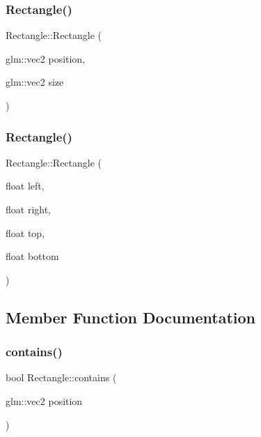 \subsubsection{\texorpdfstring{Rectangle()}{Rectangle()}\hspace{0.1cm}{\footnotesize\ttfamily [1/2]}}
{\footnotesize\ttfamily Rectangle\+::\+Rectangle (\begin{DoxyParamCaption}\item[{glm\+::vec2}]{position,  }\item[{glm\+::vec2}]{size }\end{DoxyParamCaption})}

\mbox{\label{class_rectangle_a09e01909856e5d550a34e6866e91a7c5}} 
\subsubsection{\texorpdfstring{Rectangle()}{Rectangle()}\hspace{0.1cm}{\footnotesize\ttfamily [2/2]}}
{\footnotesize\ttfamily Rectangle\+::\+Rectangle (\begin{DoxyParamCaption}\item[{float}]{left,  }\item[{float}]{right,  }\item[{float}]{top,  }\item[{float}]{bottom }\end{DoxyParamCaption})}



\subsection{Member Function Documentation}
\mbox{\label{class_rectangle_a8100e6cf7e61c5a72b91a29b5c8f2182}} 
\subsubsection{\texorpdfstring{contains()}{contains()}}
{\footnotesize\ttfamily bool Rectangle\+::contains (\begin{DoxyParamCaption}\item[{glm\+::vec2}]{position }\end{DoxyParamCaption})}



